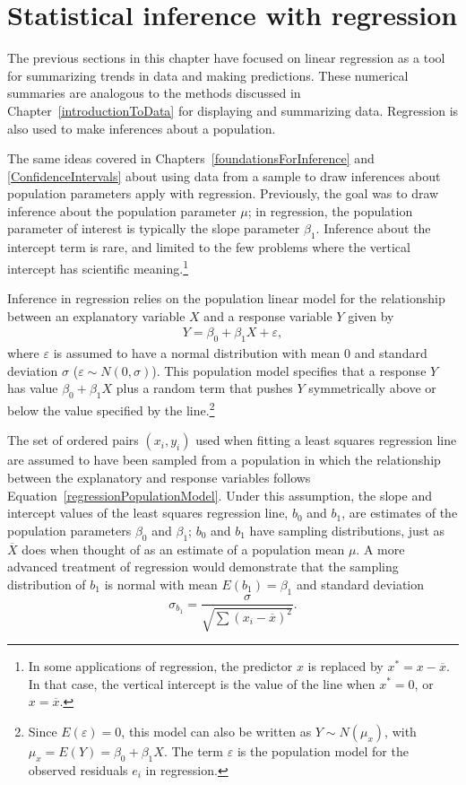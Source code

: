 \section{Statistical inference with regression}
\label{inferenceRegression}

The previous sections in this chapter have focused on linear regression as a tool for summarizing trends in data and making predictions. These numerical summaries are analogous to the methods discussed in Chapter~\ref{introductionToData} for displaying and summarizing data. Regression is also used to make inferences about a population. 

The same ideas covered in Chapters~\ref{foundationsForInference} and \ref{ConfidenceIntervals} about using data from a sample to draw inferences about population parameters apply with regression. Previously, the goal was to draw inference about the population parameter $\mu$; in regression, the population parameter of interest is typically the slope parameter $\beta_1$. Inference about the intercept term is rare, and limited to the few problems where the vertical intercept has scientific meaning.\footnote{In some applications of regression, the predictor $x$ is replaced by $x^* = x - \overline{x}$.  In that case, the vertical intercept is the value of the line when $x^* = 0$, or $x = \overline{x}$.}

Inference in regression relies on the population linear model for the relationship between an explanatory variable $X$ and a response variable $Y$ given by
\begin{align}
Y = \beta_0 + \beta_1 X + \varepsilon,
\label{regressionPopulationModel}
\end{align}
where $\varepsilon$ is assumed to have a normal distribution with mean 0 and standard deviation $\sigma$ ($\varepsilon \sim N(0, \sigma)$).  This population model specifies that a response $Y$ has value $\beta_0 + \beta_1 X$ plus a random term that pushes $Y$ symmetrically above or below the value specified by the line.\footnote{Since $E(\varepsilon) = 0$, this model can also be written as $Y\sim N(\mu_x)$, with $ \mu_x = E(Y) = \beta_0 + \beta_1 X$.  The term $\varepsilon$ is the population model for the observed residuals $e_i$ in regression.} 

The set of ordered pairs $(x_i,y_i)$ used when fitting a least squares regression line are assumed to have been sampled from a population in which the relationship between the explanatory and response variables follows Equation~\ref{regressionPopulationModel}. Under this assumption, the slope and intercept values of the least squares regression line, $b_0$ and $b_1$, are estimates of the population parameters $\beta_0$ and $\beta_1$; $b_0$ and $b_1$ have sampling distributions, just as $\overline{X}$ does when thought of as an estimate of a population mean $\mu$. A more advanced treatment of regression would demonstrate that the sampling distribution of $b_1$ is normal with mean $E(b_1) = \beta_1$ and standard deviation
\[\sigma_{b_1} = \frac{\sigma}{\sqrt{\sum(x_i -\overline{x})^2}}.\]

